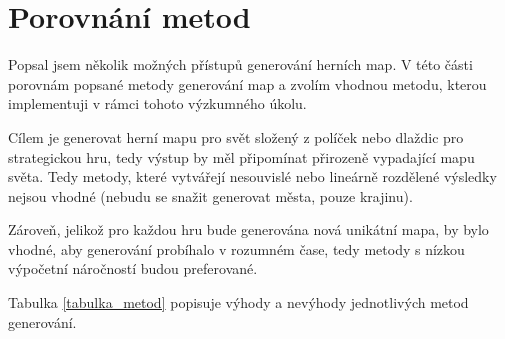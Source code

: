 \section{Porovnání metod}

Popsal jsem několik možných přístupů generování herních map. V této části porovnám popsané metody generování map a zvolím vhodnou metodu, kterou implementuji v rámci tohoto výzkumného úkolu. 

Cílem je generovat herní mapu pro svět složený z políček nebo dlaždic pro strategickou hru, tedy výstup by měl připomínat přirozeně vypadající mapu světa. Tedy metody, které vytvářejí nesouvislé nebo lineárně rozdělené výsledky nejsou vhodné (nebudu se snažit generovat města, pouze krajinu). 

Zároveň, jelikož pro každou hru bude generována nová unikátní mapa, by bylo vhodné, aby generování probíhalo v rozumném čase, tedy metody s nízkou výpočetní náročností budou preferované.

Tabulka \vref{tabulka_metod} popisuje výhody a nevýhody jednotlivých metod generování.



